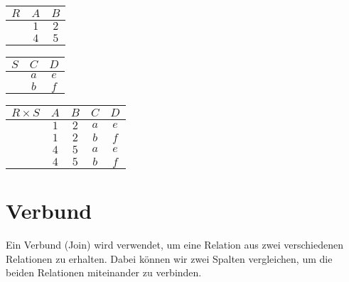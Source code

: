 \documentclass[12pt,a4paper,notitlepage,leqno]{article}
\begin{document}
\begin{center}
    \begin{tabular}{c|cc}
        $R$ & $A$ & $B$\\\hline
         & $1$ & $2$\\
         & $4$ & $5$\\
    \end{tabular}
    \hspace{1cm}
    \begin{tabular}{c|cc}
        $S$ & $C$ & $D$ \\\hline
         & $a$ & $e$\\
         & $b$ & $f$
    \end{tabular}
    \hspace{1cm}
    \begin{tabular}{c|cccc}
        $R\times S$ & $A$ & $B$ & $C$ & $D$ \\\hline
         & $1$ & $2$& $a$ & $e$\\
         & $1$ & $2$& $b$ & $f$\\
         & $4$ & $5$& $a$ & $e$\\
         & $4$ & $5$& $b$ & $f$\\
    \end{tabular}
\end{center}

\section*{Verbund}

Ein Verbund (Join) wird verwendet, um eine Relation aus zwei verschiedenen Relationen zu erhalten. Dabei können wir zwei Spalten vergleichen, um die beiden Relationen miteinander zu verbinden. 
\end{document}
